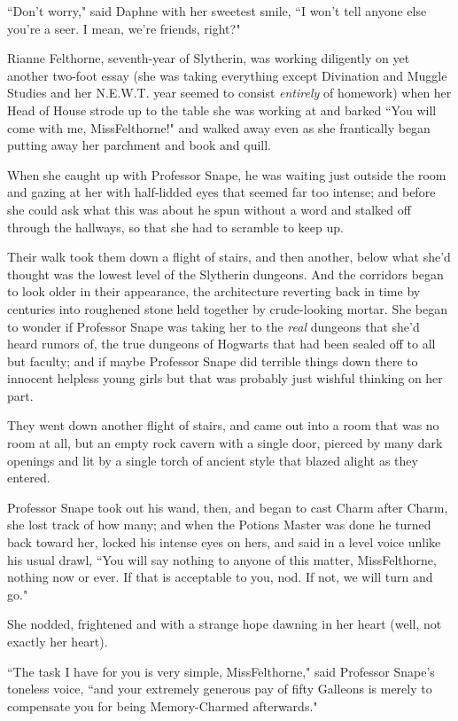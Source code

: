 ``Don't worry," said Daphne with her sweetest smile, ``I won't tell anyone else you're a seer. I mean, we're friends, right?"

\later

Rianne Felthorne, seventh-year of Slytherin, was working diligently on yet another two-foot essay (she was taking everything except Divination and Muggle Studies and her N.E.W.T. year seemed to consist \emph{entirely} of homework) when her Head of House strode up to the table she was working at and barked ``You will come with me, Miss\?Felthorne!" and walked away even as she frantically began putting away her parchment and book and quill.

When she caught up with Professor Snape, he was waiting just outside the room and gazing at her with half-lidded eyes that seemed far too intense; and before she could ask what this was about he spun without a word and stalked off through the hallways, so that she had to scramble to keep up.

Their walk took them down a flight of stairs, and then another, below what she'd thought was the lowest level of the Slytherin dungeons. And the corridors began to look older in their appearance, the architecture reverting back in time by centuries into roughened stone held together by crude-looking mortar. She began to wonder if Professor Snape was taking her to the \emph{real} dungeons that she'd heard rumors of, the true dungeons of Hogwarts that had been sealed off to all but faculty; and if maybe Professor Snape did terrible things down there to innocent helpless young girls but that was probably just wishful thinking on her part.

They went down another flight of stairs, and came out into a room that was no room at all, but an empty rock cavern with a single door, pierced by many dark openings and lit by a single torch of ancient style that blazed alight as they entered.

Professor Snape took out his wand, then, and began to cast Charm after Charm, she lost track of how many; and when the Potions Master was done he turned back toward her, locked his intense eyes on hers, and said in a level voice unlike his usual drawl, ``You will say nothing to anyone of this matter, Miss\?Felthorne, nothing now or ever. If that is acceptable to you, nod. If not, we will turn and go."

She nodded, frightened and with a strange hope dawning in her heart (well, not exactly her heart).

``The task I have for you is very simple, Miss\?Felthorne," said Professor Snape's toneless voice, ``and your extremely generous pay of fifty Galleons is merely to compensate you for being Memory-Charmed afterwards."

